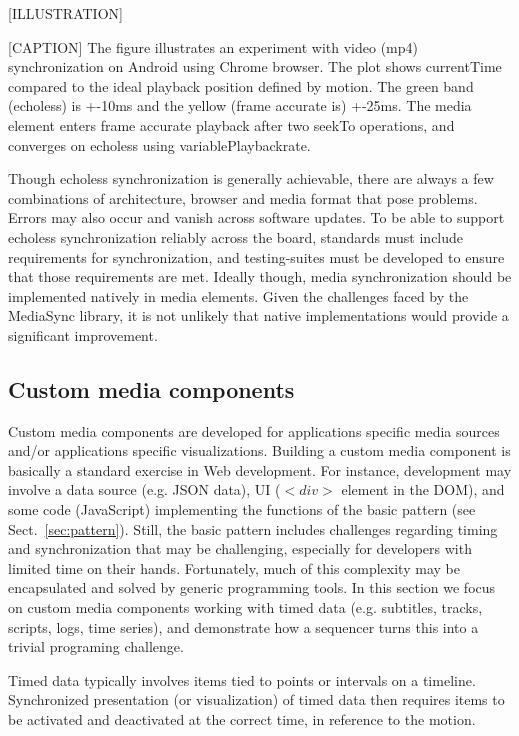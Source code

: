 [ILLUSTRATION]

[CAPTION]
The figure illustrates an experiment with video (mp4) synchronization on
Android using Chrome browser. The plot shows currentTime compared to the ideal
playback position defined by motion. The green band (echoless) is +-10ms and
the yellow (frame accurate is) +-25ms. The media element enters frame accurate
playback after two seekTo operations, and converges on echoless using
variablePlaybackrate.


Though echoless synchronization is generally achievable, there are always a
few combinations of architecture, browser and media format that pose problems.
Errors may also occur and vanish across software updates. To be able to
support echoless synchronization reliably across the board, standards must
include requirements for synchronization, and testing-suites must be developed
to ensure that those requirements are met. Ideally though, media
synchronization should be implemented natively in media elements. Given the
challenges faced by the MediaSync library, it is not unlikely that native
implementations would provide a significant improvement.

\subsection{Custom media components}

Custom media components are developed for applications specific media sources
and/or applications specific visualizations. Building a custom media component
is basically a standard exercise in Web development. For instance, development
may involve a data source (e.g. JSON data), UI ($<div>$ element in the DOM),
and some code (JavaScript) implementing the functions of the basic  pattern
(see Sect.~\ref{sec:pattern}). Still, the basic pattern includes challenges
regarding timing and synchronization that may be challenging, especially for
developers with limited time on their hands. Fortunately, much of this
complexity may be encapsulated and solved by generic programming tools. In
this section we focus on custom media components working with timed data (e.g.
subtitles, tracks, scripts, logs, time series), and demonstrate  how a
sequencer turns this into a trivial programing challenge.


Timed data typically involves items tied to points or intervals on a timeline.
Synchronized presentation (or visualization) of timed data then requires items
to be activated and deactivated at the correct time, in reference to the
motion.

